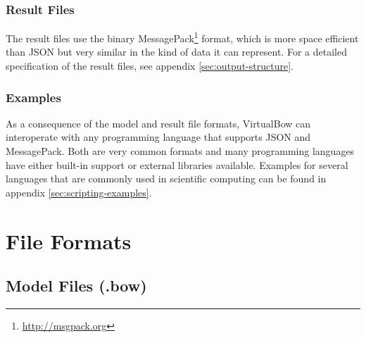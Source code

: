 \documentclass[12pt]{article}
\begin{document}
\subsubsection*{Result Files}

The result files use the binary MessagePack\footnote{\url{http://msgpack.org}} format, which is more space efficient than JSON but very similar in the kind of data it can represent. For a detailed specification of the result files, see appendix \ref{sec:output-structure}.

\subsubsection*{Examples}

As a consequence of the model and result file formats, VirtualBow can interoperate with any programming language that supports JSON and MessagePack.
Both are very common formats and many programming languages have either built-in support or external libraries available.
Examples for several languages that are commonly used in scientific computing can be found in appendix \ref{sec:scripting-examples}.

\bigskip

\appendix

\newpage
\section{File Formats}

\subsection{Model Files (.bow)}
\label{sec:input-structure}

\newcommand{\tablespace}{\rule{0pt}{3ex}}
\end{document}
